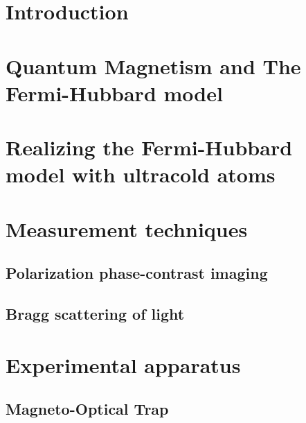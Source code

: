 \documentclass[oneside,12pt]{memoir}
\begin{document}
\tableofcontents*  %






\mainmatter
\pagestyle{rice}


\let\oldparskip\parskip
\setlength{\parskip}{0.8em}

\chapter{Introduction}

\chapter{Quantum Magnetism and The Fermi-Hubbard model}

\chapter{Realizing the Fermi-Hubbard model with ultracold atoms}


\chapter{Measurement techniques}

\section{Polarization phase-contrast imaging}

\section{Bragg scattering of light} 
 

\chapter{Experimental apparatus}

\section{Magneto-Optical Trap}
\end{document}
